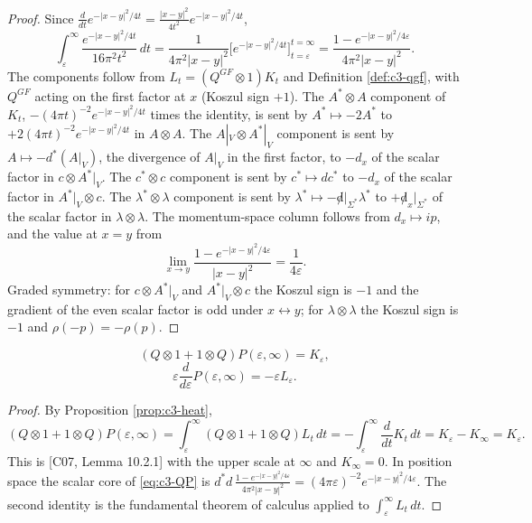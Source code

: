 \begin{proof}
Since $\frac{d}{dt}e^{-|x-y|^2/4t}=\frac{|x-y|^2}{4t^2}e^{-|x-y|^2/4t}$,
\[
\int_\varepsilon^\infty\frac{e^{-|x-y|^2/4t}}{16\pi^2t^2}\,dt=\frac{1}{4\pi^2|x-y|^2}\Big[e^{-|x-y|^2/4t}\Big]_{t=\varepsilon}^{t=\infty}=\frac{1-e^{-|x-y|^2/4\varepsilon}}{4\pi^2|x-y|^2}.
\]
The components follow from $L_t=(Q^{GF}\otimes1)K_t$ and Definition \ref{def:c3-qgf}, with $Q^{GF}$ acting on the first factor at $x$ (Koszul sign $+1$). The $A^*\otimes A$ component of $K_t$, $-(4\pi t)^{-2}e^{-|x-y|^2/4t}$ times the identity, is sent by $A^*\mapsto-2A^*$ to $+2(4\pi t)^{-2}e^{-|x-y|^2/4t}$ in $A\otimes A$. The $A|_V\otimes A^*|_V$ component is sent by $A\mapsto-d^*(A|_V)$, the divergence of $A|_V$ in the first factor, to $-d_x$ of the scalar factor in $c\otimes A^*|_V$. The $c^*\otimes c$ component is sent by $c^*\mapsto dc^*$ to $-d_x$ of the scalar factor in $A^*|_V\otimes c$. The $\lambda^*\otimes\lambda$ component is sent by $\lambda^*\mapsto-{\not d}|_{\Sigma^*}\lambda^*$ to $+{\not d}_x|_{\Sigma^*}$ of the scalar factor in $\lambda\otimes\lambda$. The momentum-space column follows from $d_x\mapsto ip$, and the value at $x=y$ from
\[
\lim_{x\to y}\frac{1-e^{-|x-y|^2/4\varepsilon}}{|x-y|^2}=\frac1{4\varepsilon}.
\]
Graded symmetry: for $c\otimes A^*|_V$ and $A^*|_V\otimes c$ the Koszul sign is $-1$ and the gradient of the even scalar factor is odd under $x\leftrightarrow y$; for $\lambda\otimes\lambda$ the Koszul sign is $-1$ and $\rho(-p)=-\rho(p)$.
\end{proof}

\begin{proposition}
\label{prop:c3-QP}
\begin{equation}
(Q\otimes1+1\otimes Q)P(\varepsilon,\infty)=K_\varepsilon,
\label{eq:c3-QP}
\end{equation}
\begin{equation}
\varepsilon\frac{d}{d\varepsilon}P(\varepsilon,\infty)=-\varepsilon L_\varepsilon .
\label{eq:c3-dP}
\end{equation}
\end{proposition}

\begin{proof}
By Proposition \ref{prop:c3-heat},
\[
(Q\otimes1+1\otimes Q)P(\varepsilon,\infty)=\int_\varepsilon^\infty(Q\otimes1+1\otimes Q)L_t\,dt=-\int_\varepsilon^\infty\frac{d}{dt}K_t\,dt=K_\varepsilon-K_\infty=K_\varepsilon .
\]
This is [C07, Lemma 10.2.1] with the upper scale at $\infty$ and $K_\infty=0$. In position space the scalar core of \eqref{eq:c3-QP} is $d^*d\,\frac{1-e^{-|x-y|^2/4\varepsilon}}{4\pi^2|x-y|^2}=(4\pi\varepsilon)^{-2}e^{-|x-y|^2/4\varepsilon}$. The second identity is the fundamental theorem of calculus applied to $\int_\varepsilon^\infty L_t\,dt$.
\end{proof}

